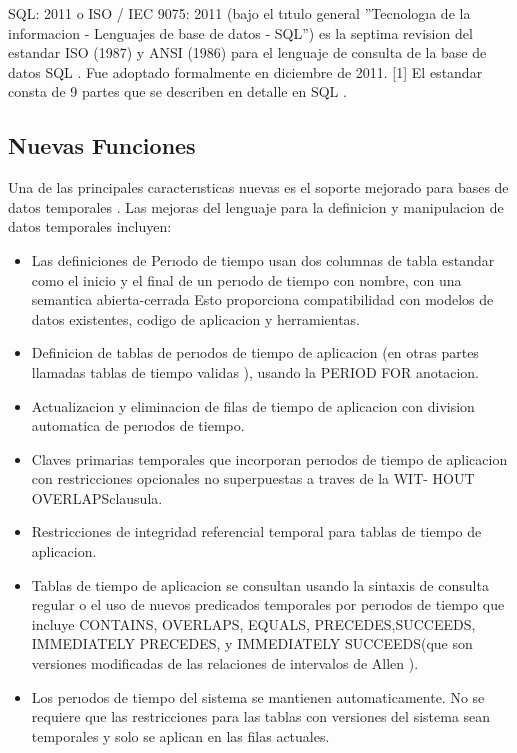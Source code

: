 \documentclass[preprint,12pt]{elsarticle}
\begin{document}
SQL: 2011 o ISO / IEC 9075: 2011 (bajo el tıtulo general ”Tecnologıa de la informacion - Lenguajes de base de datos - SQL”) es la septima revision del  estandar  ISO  (1987)  y  ANSI  (1986)  para  el  lenguaje  de  consulta  de  la base de datos SQL . Fue adoptado formalmente en diciembre de 2011. [1] El estandar consta de 9 partes que se describen en detalle en SQL .

\subsection{Nuevas Funciones}	

Una de las principales caracterısticas nuevas es el soporte mejorado para bases  de  datos  temporales  .  Las  mejoras  del  lenguaje  para  la  definicion  y manipulacion de datos temporales incluyen:
\begin{itemize}

\item Las  definiciones  de  Perıodo  de  tiempo  usan  dos  columnas  de  tabla estandar como el inicio y el final de un perıodo de tiempo con nombre, con  una  semantica  abierta-cerrada  Esto  proporciona  compatibilidad con modelos de datos existentes, codigo de aplicacion y herramientas.

\item Definicion de tablas de perıodos de tiempo de aplicacion (en otras partes llamadas tablas de tiempo validas ), usando la PERIOD FOR anotacion.

\item Actualizacion y eliminacion de filas de tiempo de aplicacion con division automatica de perıodos de tiempo.

\item Claves primarias temporales que incorporan perıodos de tiempo de aplicacion con restricciones opcionales no superpuestas a traves de la WIT- HOUT OVERLAPSclausula.

\item Restricciones de integridad referencial temporal para tablas de tiempo de aplicacion.

\item Tablas de tiempo de aplicacion se consultan usando la sintaxis de consulta regular o el uso de nuevos predicados temporales por perıodos de tiempo que incluye CONTAINS, OVERLAPS, EQUALS, PRECEDES,SUCCEEDS, IMMEDIATELY PRECEDES, y IMMEDIATELY SUCCEEDS(que son versiones modificadas de las relaciones de intervalos de Allen ).

\item Los perıodos de tiempo del sistema se mantienen automaticamente. No se requiere que las restricciones para las tablas con versiones del sistema sean temporales y solo se aplican en las filas actuales.


\end{itemize}
\end{document}
